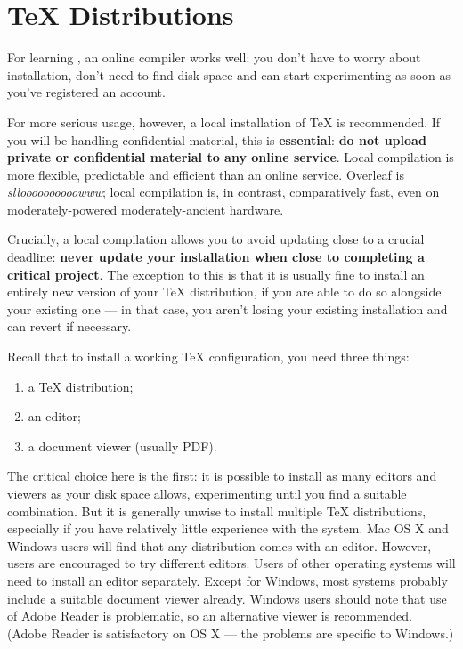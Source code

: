 \clearpage
\appendix

\section<1-| beamer:0>{\TeX{} Distributions}\label{sec:tex-distros}

For learning \LaTeXe{}, an online compiler works well: you don't have to worry about installation, don't need to find disk space and can start experimenting as soon as you've registered an account.

For more serious usage, however, a local installation of \TeX{} is recommended.
If you will be handling confidential material, this is \textbf{essential}: \textbf{do not upload private or confidential material to any online service}.
Local compilation is more flexible, predictable and efficient than an online service.
Overleaf is \emph{slloooooooooowww}; local compilation is, in contrast, comparatively fast, even on moderately-powered moderately-ancient hardware.

Crucially, a local compilation allows you to avoid updating close to a crucial deadline: \textbf{never update your installation when close to completing a critical project}.
The exception to this is that it is usually fine to install an entirely new version of your \TeX{} distribution, if you are able to do so alongside your existing one --- in that case, you aren't losing your existing installation and can revert if necessary.

Recall that to install a working \TeX{} configuration, you need three things:
\begin{enumerate}
  \item a \TeX{} distribution;
  \item an editor;
  \item a document viewer (usually PDF).
\end{enumerate}
The critical choice here is the first: it is possible to install as many editors and viewers as your disk space allows, experimenting until you find a suitable combination.
But it is generally unwise to install multiple \TeX{} distributions, especially if you have relatively little experience with the system.
Mac OS X and Windows users will find that any distribution comes with an editor.
However, users are encouraged to try different editors.
Users of other operating systems will need to install an editor separately.
Except for Windows, most systems probably include a suitable document viewer already.
Windows users should note that use of Adobe Reader is problematic, so an alternative viewer is recommended.
(Adobe Reader is satisfactory on OS X --- the problems are specific to Windows.)

